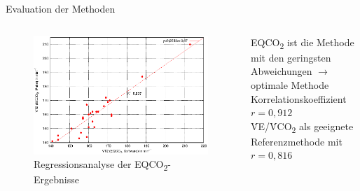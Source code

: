 \documentclass[colorBG,slideColor,8pt]{beamer}
\newcommand{\eqcotwo}{EQCO\textsubscript{2}}
\newcommand{\vcotwo}{\.{V}CO\textsubscript{2}}
\newcommand{\ve}{\.{V}E}
\begin{document}
\begin{frame}{Evaluation der Methoden}
\begin{columns}
\begin{column}{0.5\linewidth}
\begin{figure}[H]
	\centering
	\includegraphics[width=\linewidth]{Bilder/korr_eqco2.eps}
	\caption{Regressionsanalyse der \eqcotwo-Ergebnisse}
\end{figure}
\end{column}
\begin{column}{0.5\linewidth}
	\eqcotwo{} ist die Methode mit den geringsten Abweichungen $\rightarrow$ optimale Methode\\
	\vspace{3ex}
	Korrelationskoeffizient $r = 0,912$\\
	\vspace{3ex}
	\ve/\vcotwo{} als geeignete Referenzmethode mit $r = 0,816$
\end{column}
\end{columns}
\end{frame}
\end{document}
